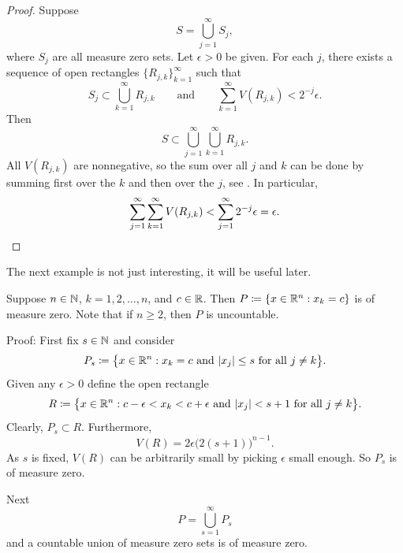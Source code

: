 \begin{proof}
Suppose
\begin{equation*}
S = \bigcup_{j=1}^\infty S_j ,
\end{equation*}
where $S_j$ are all measure zero sets.  Let $\epsilon > 0$ be given.
For each $j$,
there exists a sequence of open rectangles $\{ R_{j,k} \}_{k=1}^\infty$
such that
\begin{equation*}
S_j \subset \bigcup_{k=1}^\infty R_{j,k}
\qquad \text{and} \qquad
\sum_{k=1}^\infty V(R_{j,k}) < 2^{-j} \epsilon .
\end{equation*}
Then
\begin{equation*}
S \subset \bigcup_{j=1}^\infty \bigcup_{k=1}^\infty R_{j,k} .
\end{equation*}
All $V(R_{j,k})$ are nonnegative, so the sum over all $j$ and $k$
can be done by summing first over the $k$ and then over the $j$,
see
.
In particular,
\begin{equation*}
\sum_{j=1}^\infty \sum_{k=1}^\infty V(R_{j,k}) <
\sum_{j=1}^\infty 2^{-j} \epsilon = \epsilon . \qedhere
\end{equation*}
\end{proof}

The next example is not just interesting, it will be useful later.

\begin{example} \label{mv:example:planenull}
Suppose
$n \in {\mathbb{N}}$, $k=1,2,\ldots,n$, and $c \in {\mathbb{R}}$.
Then $P \coloneqq \{ x \in {\mathbb{R}}^n : x_k = c \}$ is of measure zero.
Note that if $n \geq 2$, then $P$ is uncountable.

Proof:
First fix $s \in {\mathbb{N}}$ and consider
\begin{equation*}
P_s \coloneqq \bigl\{ x \in {\mathbb{R}}^n : x_k = c \text{ and } \lvert {x_j} \rvert \leq s
\text{ for all } j \neq k \bigr\} .
\end{equation*}
Given any $\epsilon > 0$ define the open rectangle
\begin{equation*}
R \coloneqq \bigl\{ x \in {\mathbb{R}}^n : c-\epsilon < x_k < c+\epsilon \text{ and } \lvert {x_j} \rvert < s+1
\text{ for all } j \neq k \bigr\} .
\end{equation*}
Clearly, $P_s \subset R$.  Furthermore,
\begin{equation*}
V(R) = 2\epsilon {\bigl(2(s+1)\bigr)}^{n-1} .
\end{equation*}
As $s$ is fixed,
$V(R)$ can be
arbitrarily small by
picking $\epsilon$ small enough.
So $P_s$ is of measure zero.

Next 
\begin{equation*}
P = \bigcup_{s=1}^\infty P_s
\end{equation*}
and a countable union of measure zero sets is of measure zero.
\end{example}

